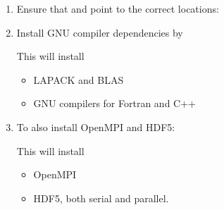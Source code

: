 \documentclass[letterpaper,10pt,english]{sphinxmanual}
\begin{document}
\begin{enumerate}
%
\item {} 
Ensure that  and  point to the correct locations:

\begin{sphinxVerbatim}[commandchars=\\\{\},formatcom=\scriptsize]
 
 
\end{sphinxVerbatim}

\item {} 
Install GNU compiler dependencies by

\begin{sphinxVerbatim}[commandchars=\\\{\},formatcom=\scriptsize]
       
\end{sphinxVerbatim}

This will install
\begin{itemize}
\item {} 
LAPACK and BLAS

\item {} 
GNU compilers for Fortran and C++

\end{itemize}

\item {} 
To also install OpenMPI and HDF5:

\begin{sphinxVerbatim}[commandchars=\\\{\},formatcom=\scriptsize]
     
\end{sphinxVerbatim}

This will install
\begin{itemize}
\item {} 
OpenMPI

\item {} 
HDF5, both serial and parallel.

\end{itemize}


\end{enumerate}
\end{document}
